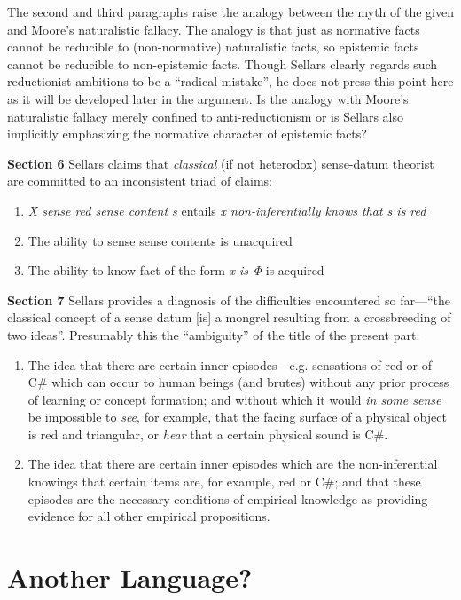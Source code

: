 \documentclass[11pt]{article}
\begin{document}
The second and third paragraphs raise the analogy between the myth of the given and Moore's naturalistic fallacy. The analogy is that just as normative facts cannot be reducible to (non-normative) naturalistic facts, so epistemic facts cannot be reducible to non-epistemic facts. Though Sellars clearly regards such reductionist ambitions to be a ``radical mistake'', he does not press this point here as it will be developed later in the argument. Is the analogy with Moore's naturalistic fallacy merely confined to anti-reductionism or is Sellars also implicitly emphasizing the normative character of epistemic facts?

\textbf{Section 6} Sellars claims that \emph{classical} (if not heterodox) sense-datum theorist are committed to an inconsistent triad of claims:
\begin{enumerate}
    \item \emph{X sense red sense content s} entails \emph{x non-inferentially knows that s is red}
    \item The ability to sense sense contents is unacquired
    \item The ability to know fact of the form \emph{x is Φ} is acquired
\end{enumerate}

\textbf{Section 7} Sellars provides a diagnosis of the difficulties encountered so far---``the classical concept of a sense datum [is] a mongrel resulting from a crossbreeding of two ideas''. Presumably this the ``ambiguity'' of the title of the present part:
\begin{enumerate}
    \item The idea that there are certain inner episodes---e.g. sensations of red or of C\# which can occur to human beings (and brutes) without any prior process of learning or concept formation; and without which it would \emph{in some sense} be impossible to \emph{see}, for example, that the facing surface of a physical object is red and triangular, or \emph{hear} that a certain physical sound is C\#.
    \item The idea that there are certain inner episodes which are the non-inferential knowings that certain items are, for example, red or C\#; and that these episodes are the necessary conditions of empirical knowledge as providing evidence for all other empirical propositions.
\end{enumerate}


\section{Another Language?} %
\label{sec:another_language_}

\end{document}
